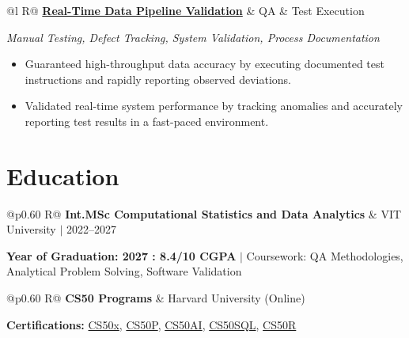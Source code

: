 \documentclass[a4paper,10pt]{article}
\newcommand{\ulink}[2]{\href{#1}{#2}}
\newcommand{\subheading}[1]{{\color[HTML]{0A0A0A}\fontsize{12}{14}\selectfont\bfseries #1}}
\newcommand{\techstack}[1]{{\color[HTML]{5C5C5C}\fontsize{10.5}{12.5}\selectfont\itshape #1}}
\newcommand{\meta}[1]{{\color[HTML]{5C5C5C}\fontsize{10.5}{12.5}\selectfont #1}}
\begin{document}
\begin{tabularx}{\linewidth}{@{}l R@{}}
\subheading{\ulink{https://github.com/su-jin1425/Real-Time-Stock-Market-Data-Pipeline}{Real-Time Data Pipeline Validation}} & \meta{QA \& Test Execution}
\end{tabularx}
\techstack{Manual Testing, Defect Tracking, System Validation, Process Documentation}
\begin{itemize}[nosep, leftmargin=1.5em, itemsep=2pt, topsep=2pt]
  \item {\color[HTML]{0A0A0A}\fontsize{11}{14}\selectfont Guaranteed high-throughput data accuracy by executing documented test instructions and rapidly reporting observed deviations.}
  \item {\color[HTML]{0A0A0A}\fontsize{11}{14}\selectfont Validated real-time system performance by tracking anomalies and accurately reporting test results in a fast-paced environment.}
\end{itemize}

\section{Education}
\vspace{2pt}

\begin{tabularx}{\linewidth}{@{}p{0.60\linewidth} R@{}}
\subheading{Int.MSc Computational Statistics and Data Analytics} & \meta{VIT University $|$ 2022--2027}
\end{tabularx}
{\color[HTML]{3A3A3A}\fontsize{11}{14}\selectfont \textbf{Year of Graduation: 2027 : 8.4/10 CGPA} $|$ Coursework: QA Methodologies, Analytical Problem Solving, Software Validation}

\begin{tabularx}{\linewidth}{@{}p{0.60\linewidth} R@{}}
\subheading{CS50 Programs} & \meta{Harvard University (Online)}
\end{tabularx}
{\color[HTML]{3A3A3A}\fontsize{11}{14}\selectfont \textbf{Certifications:} \ulink{https://cs50.harvard.edu/certificates/b14b78df-e05c-413e-a607-1dd27303053a}{CS50x}, \ulink{https://cs50.harvard.edu/certificates/32477052-9db4-49c4-a5a4-d7e58429ca2c}{CS50P}, \ulink{https://cs50.harvard.edu/certificates/9cdb4d4a-1250-4f8e-9fd7-191864e0f919}{CS50AI}, \ulink{https://cs50.harvard.edu/certificates/bc486f24-f085-4e61-8536-80940b97a1b9}{CS50SQL}, \ulink{https://cs50.harvard.edu/certificates/666838e6-a053-4d82-b179-a60fe745fd84}{CS50R}}

\end{document}
